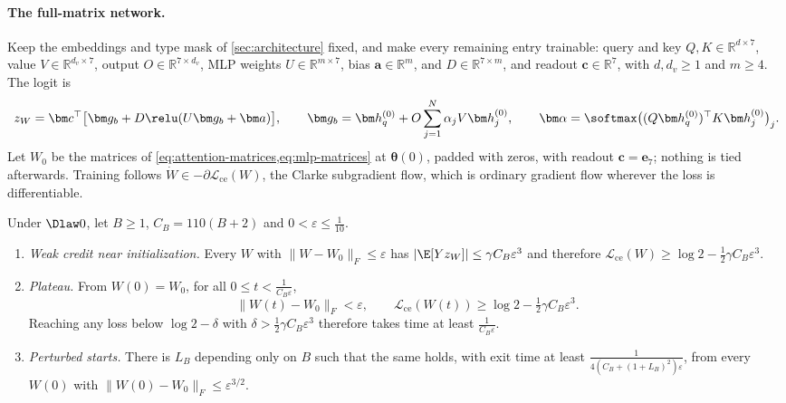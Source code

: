 \paragraph{The full-matrix network.} Keep the embeddings and type mask of \cref{sec:architecture} fixed, and make every remaining entry trainable:
query and key $Q,K\in\mathbb R^{d\times7}$, value $V\in\mathbb R^{d_v\times7}$, output $O\in\mathbb R^{7\times d_v}$, MLP weights $U\in\mathbb R^{m\times7}$, bias $\bm a\in\mathbb R^m$,
and $D\in\mathbb R^{7\times m}$, and readout $\bm c\in\mathbb R^7$, with $d,d_v\ge1$ and $m\ge4$. The logit is
\[
 z_W=\bm c^\top\bigl[\bm g_b+D\relu(U\bm g_b+\bm a)\bigr],\qquad
 \bm g_b=\bm h_q^{(0)}+O\sum_{j=1}^N\alpha_jV\bm h_j^{(0)},\qquad
 \bm\alpha=\softmax\bigl((Q\bm h_q^{(0)})^\top K\bm h_j^{(0)}\bigr)_j .
\]
Let $W_0$ be the matrices of \cref{eq:attention-matrices,eq:mlp-matrices} at $\bm\theta(0)$, padded with zeros, with readout $\bm c=\bm e_7$; nothing is tied afterwards.
Training follows $\dot W\in-\partial\mathcal L_{\mathrm{ce}}(W)$, the Clarke subgradient flow, which is ordinary gradient flow wherever the loss is differentiable.

\begin{mainresult}
\begin{theorem}
\label{thm:fullmatrix}
Under $\Dlaw0$, let $B\ge1$, $C_B=110(B+2)$ and $0<\varepsilon\le\tfrac{1}{10}$.
\begin{enumerate}[label=(\roman*),leftmargin=*,itemsep=2pt,topsep=2pt]
\item \emph{Weak credit near initialization.} Every $W$ with $\|W-W_0\|_F\le\varepsilon$ has
$|\E[Yz_W]|\le\gamma C_B\varepsilon^3$ and therefore $\mathcal L_{\mathrm{ce}}(W)\ge\log2-\tfrac12\gamma C_B\varepsilon^3$.
\item \emph{Plateau.} From $W(0)=W_0$, for all $0\le t<\tfrac{1}{C_B\varepsilon}$,
\[
 \|W(t)-W_0\|_F<\varepsilon,\qquad \mathcal L_{\mathrm{ce}}(W(t))\ge\log2-\tfrac12\gamma C_B\varepsilon^3 .
\]
Reaching any loss below $\log2-\delta$ with $\delta>\tfrac12\gamma C_B\varepsilon^3$ therefore takes time at least $\tfrac{1}{C_B\varepsilon}$.
\item \emph{Perturbed starts.} There is $L_B$ depending only on $B$ such that the same holds, with exit time at least $\tfrac{1}{4(C_B+(1+L_B)^2)\varepsilon}$,
from every $W(0)$ with $\|W(0)-W_0\|_F\le\varepsilon^{3/2}$.
\end{enumerate}
\end{theorem}
\end{mainresult}

